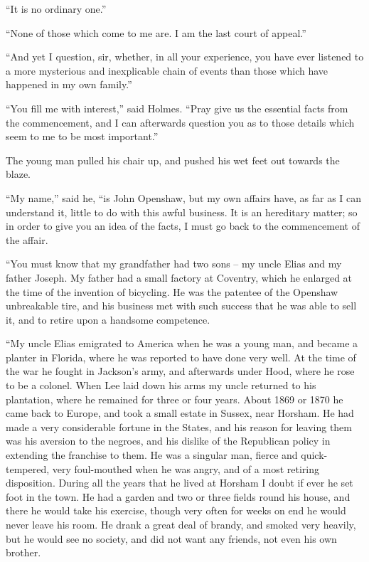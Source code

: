 “It is no ordinary one.”

“None of those which come to me are. I am the last court
of appeal.”

“And yet I question, sir, whether, in all your experience,
you have ever listened to a more mysterious and inexplicable
chain of events than those which have happened in my own
family.”

“You fill me with interest,” said Holmes. “Pray give us
the essential facts from the commencement, and I can afterwards
question you as to those details which seem to me to be
most important.”

The young man pulled his chair up, and pushed his wet
feet out towards the blaze.

“My name,” said he, “is John Openshaw, but my own affairs
have, as far as I can understand it, little to do with this
awful business. It is an hereditary matter; so in order to give
you an idea of the facts, I must go back to the commencement
of the affair.

“You must know that my grandfather had two sons -- my
uncle Elias and my father Joseph. My father had a small
factory at Coventry, which he enlarged at the time of the invention
of bicycling. He was the patentee of the Openshaw
unbreakable tire, and his business met with such success that
he was able to sell it, and to retire upon a handsome
competence.

“My uncle Elias emigrated to America when he was a
young man, and became a planter in Florida, where he was
reported to have done very well. At the time of the war
he fought in Jackson’s army, and afterwards under Hood,
where he rose to be a colonel. When Lee laid down his arms
my uncle returned to his plantation, where he remained for
three or four years. About 1869 or 1870 he came back to
Europe, and took a small estate in Sussex, near Horsham.
He had made a very considerable fortune in the States, and
his reason for leaving them was his aversion to the negroes,
and his dislike of the Republican policy in extending the
franchise to them. He was a singular man, fierce and quick-tempered,
very foul-mouthed when he was angry, and of a
most retiring disposition. During all the years that he lived
at Horsham I doubt if ever he set foot in the town. He had
a garden and two or three fields round his house, and there
he would take his exercise, though very often for weeks on
end he would never leave his room. He drank a great deal
of brandy, and smoked very heavily, but he would see no
society, and did not want any friends, not even his own brother.

